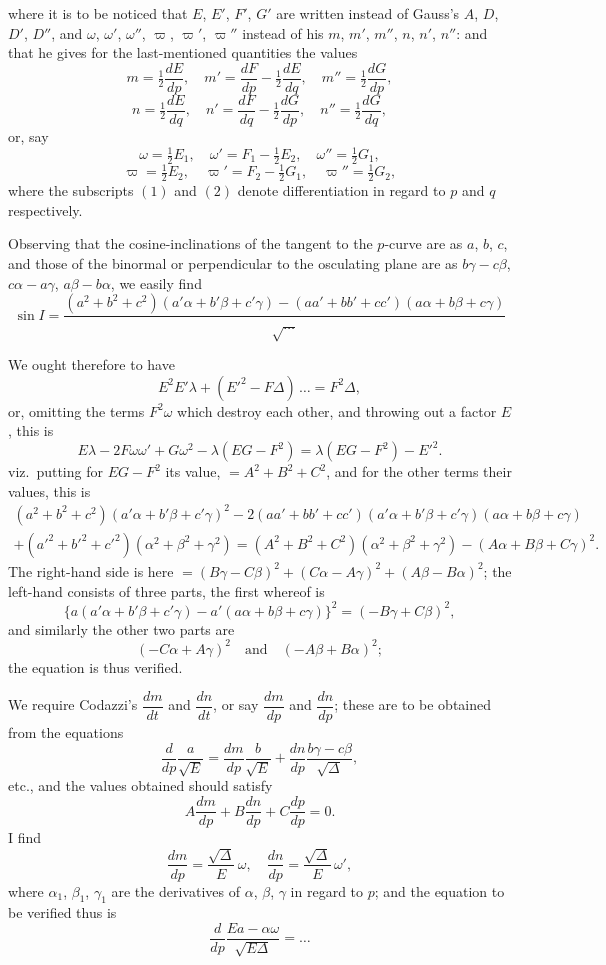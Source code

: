 \documentclass[11pt,a4paper]{article}
\begin{document}
where it is to be noticed that $E$, $E'$, $F'$, $G'$ are written instead of Gauss's $A$, $D$, $D'$, $D''$,
and $\omega$, $\omega'$, $\omega''$, $\varpi$, $\varpi'$, $\varpi''$ instead of his $m$, $m'$, $m''$, $n$, $n'$, $n''$:
and that he gives for the last-mentioned quantities the values
\[
m = \tfrac12\frac{dE}{dp}, \quad m' = \frac{dF}{dp} - \tfrac12\frac{dE}{dq}, \quad
m'' = \tfrac12\frac{dG}{dp},
\]
\[
n = \tfrac12\frac{dE}{dq}, \quad n' = \frac{dF}{dq} - \tfrac12\frac{dG}{dp}, \quad
n'' = \tfrac12\frac{dG}{dq},
\]
or, say
\[
\omega = \tfrac12 E_1, \quad \omega' = F_1 - \tfrac12 E_2, \quad \omega'' = \tfrac12 G_1,
\]
\[
\varpi = \tfrac12 E_2, \quad \varpi' = F_2 - \tfrac12 G_1, \quad \varpi'' = \tfrac12 G_2,
\]
where the subscripts $(1)$ and $(2)$ denote differentiation in regard to $p$ and $q$ respectively.

Observing that the cosine-inclinations of the tangent to the $p$-curve are as $a$, $b$, $c$,
and those of the binormal or perpendicular to the osculating plane are as $b\gamma - c\beta$,
$c\alpha - a\gamma$, $a\beta - b\alpha$, we easily find
\[
\sin I = \frac{(a^2+b^2+c^2)(a'\alpha+b'\beta+c'\gamma) - (aa'+bb'+cc')(a\alpha+b\beta+c\gamma)}{\sqrt{\ldots}}
\]

We ought therefore to have
\[
E^2E'\lambda + (E'^2 - F\Delta)\,\ldots = F^2\Delta,
\]
or, omitting the terms $F^2\omega$ which destroy each other, and throwing out a factor $E$,
this is
\[
E\lambda - 2F\omega\omega' + G\omega^2 - \lambda(EG-F^2)
= \lambda(EG-F^2) - E'^2.
\]
viz.\ putting for $EG-F^2$ its value, $=A^2+B^2+C^2$, and for the other terms their
values, this is
\begin{multline*}
(a^2+b^2+c^2)(a'\alpha+b'\beta+c'\gamma)^2
- 2(aa'+bb'+cc')(a'\alpha+b'\beta+c'\gamma)(a\alpha+b\beta+c\gamma)\\
+(a'^2+b'^2+c'^2)(\alpha^2+\beta^2+\gamma^2)
= (A^2+B^2+C^2)(\alpha^2+\beta^2+\gamma^2) - (A\alpha+B\beta+C\gamma)^2.
\end{multline*}
The right-hand side is here $= (B\gamma - C\beta)^2 + (C\alpha - A\gamma)^2 + (A\beta - B\alpha)^2$;
the left-hand consists of three parts, the first whereof is
\[
\{a(a'\alpha+b'\beta+c'\gamma) - a'(a\alpha+b\beta+c\gamma)\}^2 = (-B\gamma + C\beta)^2,
\]
and similarly the other two parts are
\[
(-C\alpha + A\gamma)^2 \quad \text{and} \quad (-A\beta + B\alpha)^2;
\]
the equation is thus verified.

We require Codazzi's $\dfrac{dm}{dt}$ and $\dfrac{dn}{dt}$, or say $\dfrac{dm}{dp}$ and $\dfrac{dn}{dp}$;
these are to be obtained from the equations
\[
\frac{d}{dp}\frac{a}{\sqrt{E}} = \frac{dm}{dp}\frac{b}{\sqrt{E}} + \frac{dn}{dp}\frac{b\gamma-c\beta}{\sqrt{\Delta}},
\]
etc., and the values obtained should satisfy
\[
A\frac{dm}{dp} + B\frac{dn}{dp} + C\frac{dp}{dp} = 0.
\]
I find
\[
\frac{dm}{dp} = \frac{\sqrt{\Delta}}{E}\,\omega, \quad
\frac{dn}{dp} = \frac{\sqrt{\Delta}}{E}\,\omega',
\]
where $\alpha_1$, $\beta_1$, $\gamma_1$ are the derivatives of $\alpha$, $\beta$, $\gamma$ in regard to $p$;
and the equation to be verified thus is
\[
\frac{d}{dp}\frac{Ea - \alpha\omega}{\sqrt{E\Delta}} = \ldots
\]
\end{document}
